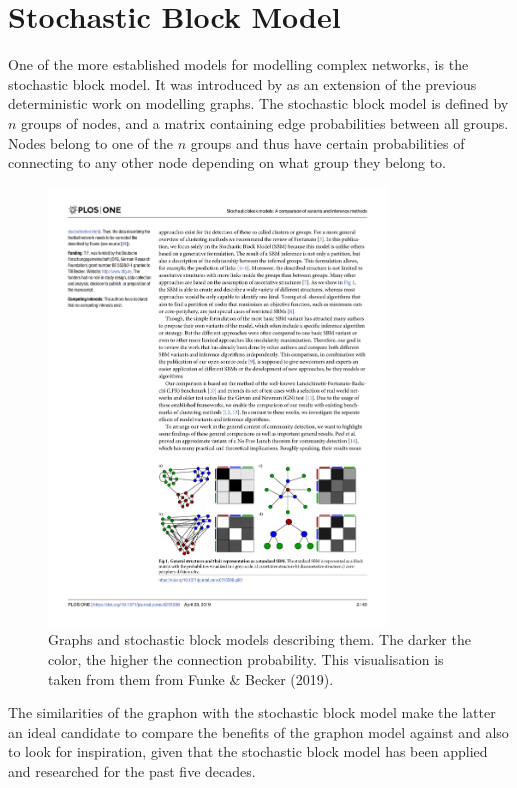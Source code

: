 \documentclass[11pt]{report} %
\begin{document}
    \section{Stochastic Block Model}
One of the more established models for modelling complex networks, is the stochastic block model. It was introduced by  as an extension of the previous deterministic work on modelling graphs. The stochastic block model is defined by $n$ groups of nodes, and a matrix containing edge probabilities between all groups. Nodes belong to one of the $n$ groups and thus have certain probabilities of connecting to any other node depending on what group they belong to.
\begin{figure}[H]
    \center
    \includegraphics[width= 0.8\textwidth]{sbm}%
    \caption{Graphs and stochastic block models describing them. The darker the color, the higher the connection probability. This visualisation is taken from them from Funke \& Becker (2019).}
    \label{fig:adjacencymatricesgraphon}
\end{figure}
\noindent
The similarities of the graphon with the stochastic block model make the latter an ideal candidate to compare the benefits of the graphon model against and also to look for inspiration, given that the stochastic block model has been applied and researched for the past five decades.
\end{document}

